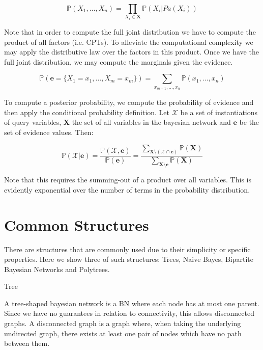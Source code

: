 \documentclass{amsart}
\makeatletter
\def\subsection{\@startsection{subsection}{3}%
  \z@{.5\linespacing\@plus.7\linespacing}{.1\linespacing}%
  {\normalfont\itshape}}
\theoremstyle{plain}
\newcommand{\pr}{\mathbb{P}}
\makeatother
\begin{document}
\begin{equation*}
  \pr(X_1,\ldots,X_n) = \prod_{X_i\in \mathbf{X}} \pr(X_i|Pa(X_i))
\end{equation*}

Note that in order to compute the full joint distribution we have to compute the product of all
factors (i.e. CPTs). To alleviate the computational complexity we may apply the distributive law
over the factors in this product. Once we have the full joint distribution, we may compute the
marginals given the evidence.

\begin{equation*}
  \pr(\mathbf{e}=\{X_1=x_1,\ldots,X_m=x_m\}) = \sum_{x_{m+1},\ldots,x_n} \pr(x_1,\ldots,x_n)
\end{equation*}

To compute a posterior probability, we compute the probability of evidence and then apply the
conditional probability definition. Let $\mathcal{X}$ be a set of instantiations of query
variables, $\mathbf{X}$ the set of all variables in the bayesian network and $\mathbf{e}$ be the
set of evidence values. Then:

\begin{equation*}
  \pr(\mathcal{X}|\mathbf{e})=\frac{\pr(\mathcal{X},\mathbf{e})}{\pr(\mathbf{e})}=
  \frac{\sum_{\mathbf{X}\setminus(\mathcal{X}\cap\mathbf{e})} \pr(\mathbf{X})}{\sum_{\mathbf{X}
  \setminus\mathbf{e}} \pr(\mathbf{X})}
\end{equation*}

Note that this requires the summing-out of a product over all variables. This is evidently
exponential over the number of terms in the probability distribution.

\section{Common Structures}

There are structures that are commonly used due to their simplicity or specific properties. Here
we show three of such structures: Trees, Naive Bayes, Bipartite Bayesian Networks and Polytrees.

\subsection{Tree}

A tree-shaped bayesian network is a BN where each node has at most one parent. Since we have no
guarantees in relation to connectivity, this allows disconnected graphs. A disconnected graph is
a graph where, when taking the underlying undirected graph, there exists at least one pair of nodes
which have no path between them.
\end{document}
